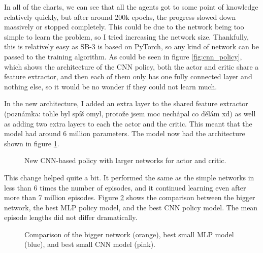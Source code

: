 \documentclass[
  digital,     %
  oneside,     %
  nosansbold,  %
  nocolorbold, %
  lof,         %
  lot,         %
]{fithesis4}
\begin{document}
In all of the charts, we can see that all the agents got to some point of knowledge relatively quickly, but after around 200k epochs, the progress slowed down massively or stopped completely. This could be due to the network being too simple to learn the problem, so I tried increasing the network size. Thankfully, this is relatively easy as SB-3 is based on PyTorch, so any kind of network can be passed to the training algorithm. As could be seen in figure \ref{fig:cnn_policy}, which shows the architecture of the CNN policy, both the actor and critic share a feature extractor, and then each of them only has one fully connected layer and nothing else, so it would be no wonder if they could not learn much.

In the new architecture, I added an extra layer to the shared feature extractor (poznámka: tohle byl spíš omyl, protože jsem moc nechápal co dělám xd) as well as adding two extra layers to each the actor and the critic. This meant that the model had around 6 million parameters. The model now had the architecture shown in figure \ref{fig:bigger_net_policy}.

\begin{figure}
    \caption{New CNN-based policy with larger networks for actor and critic.}
    \label{fig:bigger_net_policy}
\end{figure}

This change helped quite a bit. It performed the same as the simple networks in less than 6 times the number of episodes, and it continued learning even after more than 7 million episodes. Figure \ref{fig:v3_bigger_net} shows the comparison between the bigger network, the best MLP policy model, and the best CNN policy model. The mean episode lengths did not differ dramatically.

\begin{figure}
    \centering
    \makebox[\textwidth][c]{}
    \caption{Comparison of the bigger network (orange), best small MLP model (blue), and best small CNN model (pink).}
    \label{fig:v3_bigger_net}
\end{figure}
\end{document}
